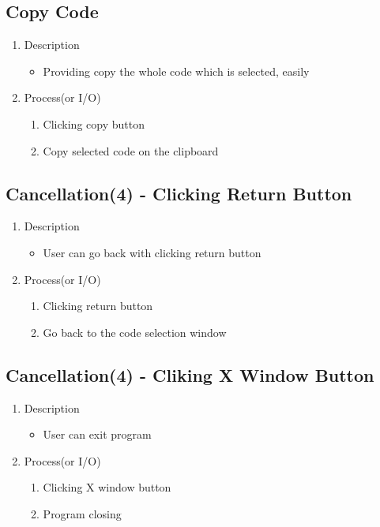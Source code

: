 \documentclass[conference]{IEEEtran}
\begin{document}
\subsection{Copy Code}

\begin{enumerate}
  \item Description
  \begin{itemize}
    \item Providing copy the whole code which is selected, easily
  \end{itemize}
  \item Process(or I/O)
  \begin{enumerate}
    \item Clicking copy button
    \item Copy selected code on the clipboard
  \end{enumerate}
\end{enumerate}
\textit{}



\subsection{Cancellation(4) - Clicking Return Button}
\begin{enumerate}
  \item Description
  \begin{itemize}
    \item User can go back with clicking return button
  \end{itemize}
  \item Process(or I/O)
  \begin{enumerate}
    \item Clicking return button
    \item Go back to the code selection window
  \end{enumerate}
\end{enumerate}
\textit{}


\subsection{Cancellation(4) - Cliking X Window Button}
\begin{enumerate}
  \item Description
  \begin{itemize}
    \item User can exit program
  \end{itemize}
  \item Process(or I/O)
  \begin{enumerate}
    \item Clicking X window button
    \item Program closing
  \end{enumerate}
\end{enumerate}
\textit{}
\end{document}
